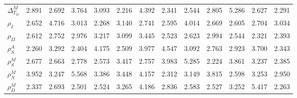 \begin{center}
\begin{longtable}{lcccccccccccc}
$ {\Delta^{M}_{T_D}}   $	 & 	       2.891	 & 	       2.692	 & 	       3.764	 & 	       3.093	 & 	       2.216	 & 	       4.392	 & 	       2.341	 & 	       2.544	 & 	       2.805	 & 	       5.286	 & 	       2.627	 & 	       2.291 \\ 
$ {\rho_{I}}           $	 & 	       2.652	 & 	       4.716	 & 	       3.013	 & 	       2.268	 & 	       3.140	 & 	       2.741	 & 	       2.595	 & 	       4.014	 & 	       2.669	 & 	       2.605	 & 	       2.704	 & 	       3.034 \\ 
$ {\rho_{II}}          $	 & 	       2.612	 & 	       2.752	 & 	       2.976	 & 	       3.217	 & 	       3.099	 & 	       3.445	 & 	       2.523	 & 	       2.623	 & 	       2.994	 & 	       2.544	 & 	       2.321	 & 	       2.393 \\ 
$ {\rho^{A}_{S}}       $	 & 	       2.260	 & 	       3.292	 & 	       2.404	 & 	       4.175	 & 	       2.509	 & 	       3.977	 & 	       4.547	 & 	       3.092	 & 	       2.763	 & 	       2.923	 & 	       3.700	 & 	       2.343 \\ 
$ {\rho^{M}_{S}}       $	 & 	       2.677	 & 	       2.663	 & 	       2.778	 & 	       2.573	 & 	       3.417	 & 	       2.757	 & 	       3.983	 & 	       5.285	 & 	       2.224	 & 	       3.861	 & 	       3.237	 & 	       2.385 \\ 
$ {\rho^{M}_{N}}       $	 & 	       3.952	 & 	       3.247	 & 	       5.568	 & 	       3.386	 & 	       3.448	 & 	       4.157	 & 	       2.312	 & 	       3.149	 & 	       3.815	 & 	       2.598	 & 	       3.253	 & 	       2.950 \\ 
$ {\rho^{M}_{D}}       $	 & 	       2.337	 & 	       2.693	 & 	       2.501	 & 	       2.524	 & 	       3.265	 & 	       4.186	 & 	       2.836	 & 	       2.583	 & 	       2.527	 & 	       3.252	 & 	       5.417	 & 	       2.263 \\ 
\end{longtable}
 \end{center}
